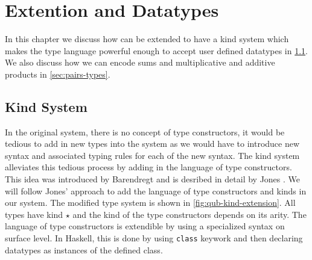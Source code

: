 \chapter{\qub{} Extention and Datatypes}\label{chp:datatypes}

In this chapter we discuss how \qub{} can be extended to have a kind system which makes
the type language powerful enough to accept user defined datatypes in \cref{sec:kind-system}. We also discuss
how we can encode sums and multiplicative and additive products in \cref{sec:pairs-types}.


\section{Kind System}\label{sec:kind-system}
In the original system, there is no concept of type constructors, it would be tedious to add in
new types into the system as we would have to introduce new syntax and associated typing rules for
each of the new syntax. The kind system alleviates this tedious process by adding in the language
of type constructors. This idea was introduced by Barendregt \citeyearpar{barendregt_1991} and
is desribed in detail by Jones \citeyearpar{jones_system_1993}. We will follow Jones' approach
to add the language of type constructors and kinds in our system. The modified type system is shown in \cref{fig:qub-kind-extension}. All types have kind $\star$ and the
kind of the type constructors depends on its arity. The language of type constructors is extendible
by using a specialized syntax on surface level. In Haskell, this is done by using \texttt{class} keywork
and then declaring datatypes as instances of the defined class.

